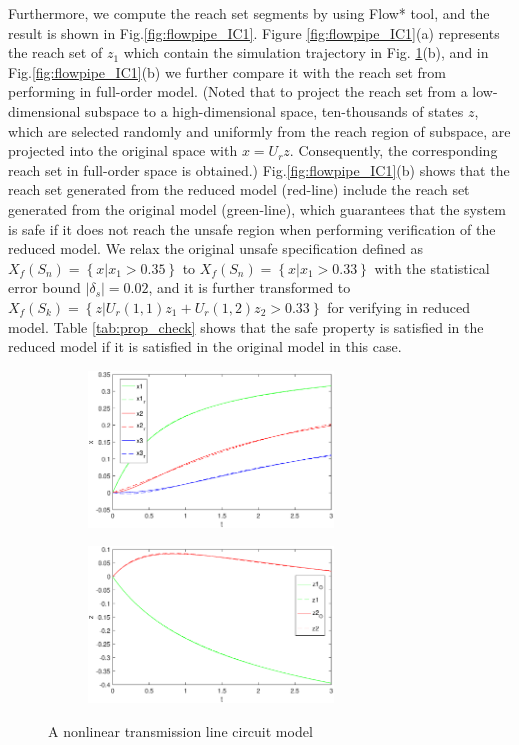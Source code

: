 \documentclass[runningheads,a4paper]{llncs}
\theoremstyle{definition}
\theoremstyle{plain}
\begin{document}
Furthermore, we compute the reach set segments by using Flow* tool, and the result is shown in Fig.\ref{fig:flowpipe_IC1}. Figure \ref{fig:flowpipe_IC1}(a) represents the reach set of $z_1$ which contain the simulation trajectory in Fig. \ref{fig:sim_IC1}(b), and in Fig.\ref{fig:flowpipe_IC1}(b) we further compare it with the reach set from performing in full-order model. (Noted that to project the reach set from a low-dimensional subspace to a high-dimensional space, ten-thousands of states $z$, which are selected randomly and uniformly from the reach region of subspace, are projected into the original space with $x=U_r z$. Consequently, the corresponding reach set in full-order space is obtained.) Fig.\ref{fig:flowpipe_IC1}(b) shows that the reach set generated from the reduced model (red-line) include the reach set generated from the original model (green-line), which guarantees that the system is safe if it does not reach the unsafe region when performing verification of the reduced model. We relax the original unsafe specification defined as $X_f(S_n)=\left\{ x | x_1>0.35\right\}$ to $X_f(S_n)=\left\{x | x_1>0.33\right\}$ with the statistical error bound $|\delta_s|=0.02$, and it is further transformed to $X_f(S_k)=\left\{z| U_{r}(1,1)z_1+U_{r}(1,2)z_2>0.33\right\}$ for verifying in reduced model. Table \ref{tab:prop_check} shows that the safe property is satisfied in the reduced model if it is satisfied in the original model in this case.   

\begin{figure}[h]
\begin{subfigure}{.5\textwidth}
  \centering
   \includegraphics[width=6.5cm]{IC1x_k2comapre.eps}
   \parbox{4cm}{\subcaption{}}
\end{subfigure}%
\begin{subfigure}{.5\textwidth}
  \centering
  \includegraphics[width=6.5cm]{IC1z_k2comapre.eps}
  \parbox{4cm}{\subcaption{}}
\end{subfigure}
\caption{A nonlinear transmission line circuit model}
\label{fig:sim_IC1}
\end{figure}
\end{document}
